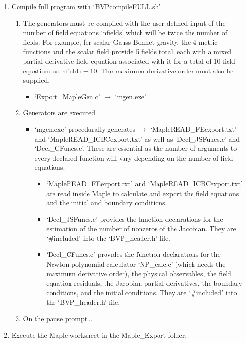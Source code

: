 \documentclass{article}
\newcommand{\rarr}{\rightarrow}
\begin{document}
\begin{enumerate}
\item Compile full program with `BVPcompileFULL.sh'
\begin{enumerate}
\item The generators must be compiled with the user defined input of the number of field equations `nfields' which will be twice the number of fields. For example, for scalar-Gauss-Bonnet gravity, the 4 metric functions and the scalar field provide 5 fields total, each with a mixed partial derivative field equation associated with it for a total of 10 field equations so $\mathrm{nfields} = 10$. The maximum derivative order must also be supplied.
\begin{itemize}
\item `Export\_MapleGen.c' $\rarr$ `mgen.exe'
\end{itemize}
\item Generators are executed
\begin{itemize}
\item `mgen.exe' procedurally generates $\rarr$ `MapleREAD\_FEexport.txt' and `MapleREAD\_ICBCexport.txt' as well as `Decl\_JSFuncs.c' and `Decl\_CFuncs.c'. These are essential as the number of arguments to every declared function will vary depending on the number of field equations.
\begin{itemize}
\item `MapleREAD\_FEexport.txt' and `MapleREAD\_ICBCexport.txt' are read inside Maple to calculate and export the field equations and the initial and boundary conditions.
\item `Decl\_JSFuncs.c' provides the function declarations for the estimation of the number of nonzeros of the Jacobian. They are `\#included' into the `BVP\_header.h' file.
\item `Decl\_CFuncs.c' provides the function declarations for the Newton polynomial calculator `NP\_calc.c' (which needs the maximum derivative order), the physical observables, the field equation residuals, the Jacobian partial derivatives, the boundary conditions, and the initial conditions. They are `\#included' into the `BVP\_header.h' file.
\end{itemize}
\end{itemize}
\item On the pause prompt...
\end{enumerate}
\item Execute the Maple worksheet in the Maple\_Export folder.
\begin{enumerate}

\end{enumerate}
\end{enumerate}
\end{document}
